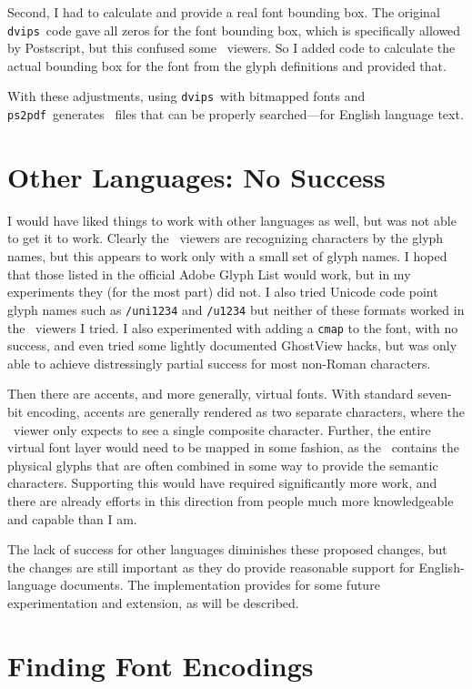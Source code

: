 \documentclass{ltugboat}
\def\PDF{\acro{PDF}}
\def\dvips{\texttt{dvips}}
\def\ps2pdf{\texttt{ps2pdf}}
\begin{document}
Second, I had to calculate and provide a real font bounding
box.  The original \dvips\ code gave all zeros for the font
bounding box, which is specifically allowed by Postscript,
but this confused some \PDF\ viewers.  So I added code to
calculate the actual bounding box for the font from the
glyph definitions and provided that.

With these adjustments, using \dvips\ with bitmapped fonts
and \ps2pdf\ generates \PDF\ files that can be properly
searched---for English language text.

\section{Other Languages: No Success}

I would have liked things to work with other languages as
well, but was not able to get it to work.  Clearly the
\PDF\ viewers are recognizing characters by the glyph
names, but this appears to work only with a small set of
glyph names.  I hoped that those listed in the official
Adobe Glyph List would work, but in my experiments they
(for the most part) did not.  I also tried Unicode code
point glyph names such as \texttt{/uni1234} and \texttt{/u1234}
but neither of these formats worked in the \PDF\ viewers
I tried.  I also experimented with adding a \texttt{cmap}
to the font, with no success, and even tried some lightly
documented GhostView hacks, but was only able to achieve
distressingly partial success for most non-Roman characters.

Then there are accents, and more generally, virtual fonts.
With standard seven-bit encoding, accents are generally
rendered as two separate characters, where the \PDF\ viewer
only expects to see a single composite character.  Further,
the entire virtual font layer would need to be mapped in
some fashion, as the \PDF\ contains the physical glyphs
that are often combined in some way to provide the semantic
characters.  Supporting this would have required significantly
more work, and there are already efforts in this direction
from people much more knowledgeable and capable than I am.

The lack of success for other languages diminishes these
proposed changes, but the changes are still important as they
do provide reasonable support for English-language documents.
The implementation provides for some future experimentation and
extension, as will be described.

\section{Finding Font Encodings}
\end{document}
